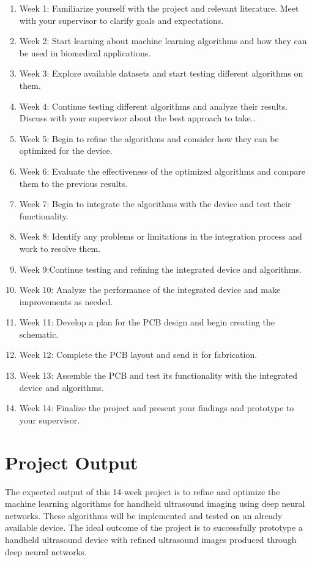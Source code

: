 \documentclass[12pt]{article}
\begin{document}
\begin{enumerate}
    \item Week 1: Familiarize yourself with the project and relevant literature. Meet with your supervisor to clarify goals and expectations.
    \item Week 2: Start learning about machine learning algorithms and how they can be used in biomedical applications.
    \item Week 3:  Explore available datasets and start testing different algorithms on them.
    \item Week 4: Continue testing different algorithms and analyze their results. Discuss with your supervisor about the best approach to take..
    \item Week 5: Begin to refine the algorithms and consider how they can be optimized for the device.
     \item Week 6: Evaluate the effectiveness of the optimized algorithms and compare them to the previous results.
      \item Week 7: Begin to integrate the algorithms with the device and test their functionality.
       \item Week 8: Identify any problems or limitations in the integration process and work to resolve them.
        \item Week 9:Continue testing and refining the integrated device and algorithms.
\item Week 10: Analyze the performance of the integrated device and make improvements as needed.
\item Week 11: Develop a plan for the PCB design and begin creating the schematic.


         \item Week 12: Complete the PCB layout and send it for fabrication.

          \item Week 13: Assemble the PCB and test its functionality with the integrated device and algorithms.
           \item Week 14: Finalize the project and present your findings and prototype to your supervisor.

\end{enumerate}

\section{Project Output}
The expected output of this 14-week project is to refine and optimize the machine learning algorithms for handheld ultrasound imaging using deep neural networks. These algorithms will be implemented and tested on an already available device. The ideal outcome of the project is to successfully prototype a handheld ultrasound device with refined ultrasound images produced through deep neural networks.
\end{document}
